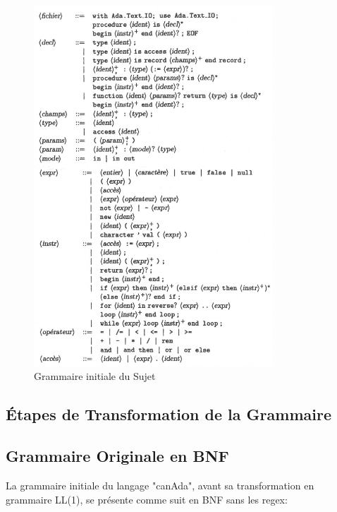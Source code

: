 \documentclass[french,a4paper]{article}
\begin{document}
    \begin{figure}[H]
        \centering
        \includegraphics[width=0.8\textwidth]{grammaire_init}
        \caption{Grammaire initiale du Sujet}\label{fig:figure}
    \end{figure}

    \subsection{Étapes de Transformation de la Grammaire}\label{subsec:etapes-de-transformation-de-la-grammaire}

    \subsection{Grammaire Originale en BNF}\label{subsec:grammaire-originale-en-bnf}

    La grammaire initiale du langage "canAda", avant sa transformation en grammaire LL(1), se présente comme suit en BNF sans les regex:
\end{document}
